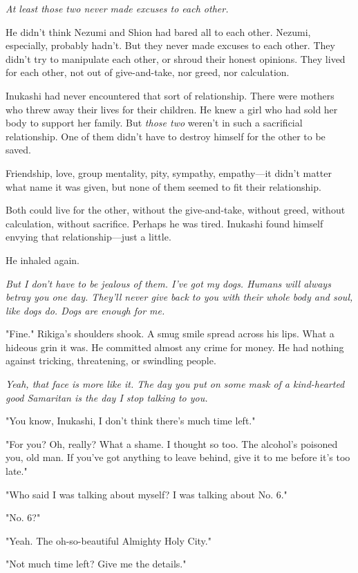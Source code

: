 \emph{At least those two never made excuses to each other.}

He didn't think Nezumi and Shion had bared all to each other. Nezumi,
especially, probably hadn't. But they never made excuses to each other.
They didn't try to manipulate each other, or shroud their honest
opinions. They lived for each other, not out of give-and-take, nor
greed, nor calculation.

Inukashi had never encountered that sort of relationship. There were
mothers who threw away their lives for their children. He knew a girl
who had sold her body to support her family. But \emph{those two} weren't in
such a sacrificial relationship. One of them didn't have to destroy
himself for the other to be saved.

Friendship, love, group mentality, pity, sympathy, empathy---it didn't
matter what name it was given, but none of them seemed to fit their
relationship.

Both could live for the other, without the give-and-take, without greed,
without calculation, without sacrifice. Perhaps he was tired. Inukashi
found himself envying that relationship---just a little.

He inhaled again.

\emph{But I don't have to be jealous of them. I've got my dogs. Humans will
always betray you one day. They'll never give back to you with their
whole body and soul, like dogs do. Dogs are enough for me.}

"Fine." Rikiga's shoulders shook. A smug smile spread across his lips.
What a hideous grin it was. He committed almost any crime for money. He
had nothing against tricking, threatening, or swindling people.

\emph{Yeah, that face is more like it. The day you put on some mask of a
kind-hearted good Samaritan is the day I stop talking to you.}

"You know, Inukashi, I don't think there's much time left."

"For you? Oh, really? What a shame. I thought so too. The alcohol's
poisoned you, old man. If you've got anything to leave behind, give it
to me before it's too late."

"Who said I was talking about myself? I was talking about No. 6."

"No. 6?"

"Yeah. The oh-so-beautiful Almighty Holy City."

"Not much time left? Give me the details."

